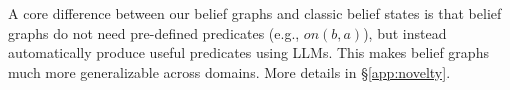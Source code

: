 A core difference between our belief graphs and classic belief states is that belief graphs do not need pre-defined  predicates (e.g., $on(b, a)$), but instead automatically produce useful predicates using LLMs. This makes belief graphs much more generalizable across domains. More details in \S\ref{app:novelty}.
